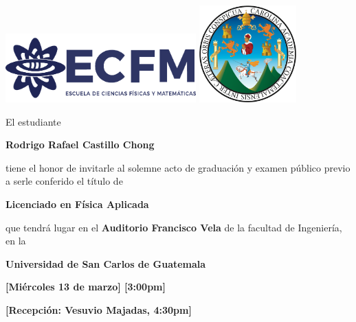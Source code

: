 \documentclass[letterpaper,12pt]{article}
\begin{document}
\pagestyle{empty}

\def \downleft{current page.south west}


\begin{center}
	\includegraphics[width=0.55\textwidth]{1.png}\hfill
    \includegraphics[width=0.28\textwidth]{usaclogo.png}
    

    \vspace{1cm}

    {\large El estudiante}

    \vspace{1cm}

    \textbf{\Large Rodrigo Rafael Castillo Chong}

    \vspace{1cm}
\large
    {tiene el honor de invitarle al solemne acto de graduación y examen público previo a serle conferido el título de}

    \vspace{1cm}

    \textbf{\Large Licenciado en Física Aplicada}

    \vspace{1cm}

    {\large que tendrá lugar en el \textbf{Auditorio Francisco Vela} de la facultad de Ingeniería, en la }

    \vspace{1cm}
    {\Large \textbf{Universidad de San Carlos de Guatemala}}
    \vspace{1cm}

    \textbf{\large [Miércoles 13 de marzo] \hspace{0.5cm} [3:00pm]}

    \vspace{1cm}

    \textbf{\large [Recepción: Vesuvio Majadas, 4:30pm]}

\end{center}
\end{document}
